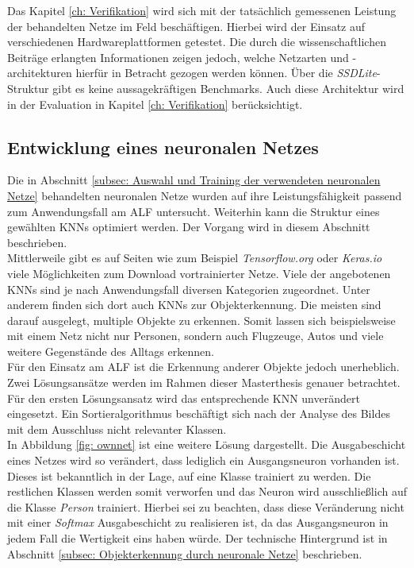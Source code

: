 		Das Kapitel \ref{ch: Verifikation} wird sich mit der tatsächlich gemessenen Leistung der behandelten Netze im Feld beschäftigen. Hierbei wird der Einsatz auf verschiedenen Hardwareplattformen getestet. Die durch die wissenschaftlichen Beiträge erlangten Informationen zeigen jedoch, welche Netzarten und -architekturen hierfür in Betracht gezogen werden können. Über die \textit{SSDLite}-Struktur gibt es keine aussagekräftigen Benchmarks. Auch diese Architektur wird in der Evaluation in Kapitel \ref{ch: Verifikation} berücksichtigt.
		
		\subsection{Entwicklung eines neuronalen Netzes}
		\label{subsec: Entwickeltes neuronales Netz}
		
		Die in Abschnitt \ref{subsec: Auswahl und Training der verwendeten neuronalen Netze} behandelten neuronalen Netze wurden auf ihre Leistungsfähigkeit passend zum Anwendungsfall am ALF untersucht. Weiterhin kann die Struktur eines gewählten KNNs optimiert werden. Der Vorgang wird in diesem Abschnitt beschrieben.\\
		
		Mittlerweile gibt es auf Seiten wie zum Beispiel \textit{Tensorflow.org} oder \textit{Keras.io} viele Möglichkeiten zum Download vortrainierter Netze. Viele der angebotenen KNNs sind je nach Anwendungsfall diversen Kategorien zugeordnet. Unter anderem finden sich dort auch KNNs zur Objekterkennung. Die meisten sind darauf ausgelegt, multiple Objekte zu erkennen. Somit lassen sich beispielsweise mit einem Netz nicht nur Personen, sondern auch Flugzeuge, Autos und viele weitere Gegenstände des Alltags erkennen. \\ 
		
		
		\newpage
		Für den Einsatz am ALF ist die Erkennung anderer Objekte jedoch unerheblich. Zwei Lösungsansätze werden im Rahmen dieser Masterthesis genauer betrachtet. Für den ersten Lösungsansatz wird das entsprechende KNN unverändert eingesetzt. Ein Sortieralgorithmus beschäftigt sich nach der Analyse des Bildes mit dem Ausschluss nicht relevanter Klassen.\\
		
		In Abbildung \ref{fig: ownnet} ist eine weitere Lösung dargestellt. Die Ausgabeschicht eines Netzes wird so verändert, dass lediglich ein Ausgangsneuron vorhanden ist. Dieses ist bekanntlich in der Lage, auf eine Klasse trainiert zu werden. Die restlichen Klassen werden somit verworfen und das Neuron wird ausschließlich auf die Klasse \textit{Person} trainiert. Hierbei sei zu beachten, dass diese Veränderung nicht mit einer \textit{Softmax} Ausgabeschicht zu realisieren ist, da das Ausgangsneuron in jedem Fall die Wertigkeit eins haben würde. Der technische Hintergrund ist in Abschnitt \ref{subsec: Objekterkennung durch neuronale Netze} beschrieben.\\
		
